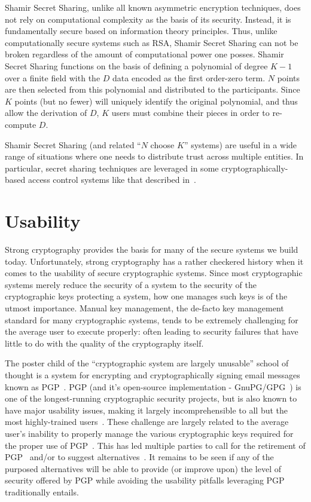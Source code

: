 Shamir Secret Sharing, unlike all known asymmetric encryption
techniques, does not rely on computational complexity as the basis of
its security. Instead, it is fundamentally secure based on information
theory principles. Thus, unlike computationally secure systems such as
RSA, Shamir Secret Sharing can not be broken regardless of the amount
of computational power one posses. Shamir Secret Sharing functions on
the basis of defining a polynomial of degree $K-1$ over a finite field
with the $D$ data encoded as the first order-zero term. $N$ points are
then selected from this polynomial and distributed to the
participants. Since $K$ points (but no fewer) will uniquely identify the
original polynomial, and thus allow the derivation of $D$, $K$ users must
combine their pieces in order to re-compute $D$.

Shamir Secret Sharing (and related ``$N$ choose $K$'' systems) are
useful in a wide range of situations where one needs to distribute
trust across multiple entities. In particular, secret sharing
techniques are leveraged in some cryptographically-based access
control systems like that described in~\cite{goyal2006}.

\section{Usability}
\label{chap:background:usability}

Strong cryptography provides the basis for many of the secure systems
we build today. Unfortunately, strong cryptography has a rather
checkered history when it comes to the usability of secure
cryptographic systems. Since most cryptographic systems merely reduce
the security of a system to the security of the cryptographic keys
protecting a system, how one manages such keys is of the utmost
importance. Manual key management, the de-facto key management
standard for many cryptographic systems, tends to be extremely
challenging for the average user to execute properly: often leading to
security failures that have little to do with the quality of the
cryptography itself.

The poster child of the ``cryptographic system are largely unusable''
school of thought is a system for encrypting and cryptographically
signing email messages known as PGP~\cite{callas2007}. PGP (and it's
open-source implementation - GnuPG/GPG~\cite{gnupg}) is one of the
longest-running cryptographic security projects, but is also known to
have major usability issues, making it largely incomprehensible to all
but the most highly-trained users~\cite{whitten1999}. These challenge
are largely related to the average user's inability to properly manage
the various cryptographic keys required for the proper use of
PGP~\cite{green-challenge}. This has led multiple parties to call for
the retirement of PGP~\cite{green-pgp} and/or to suggest
alternatives~\cite{borisov2004, mailpile, openwhisper,
  google-endtoend}. It remains to be seen if any of the purposed
alternatives will be able to provide (or improve upon) the level of
security offered by PGP while avoiding the usability pitfalls
leveraging PGP traditionally entails.

